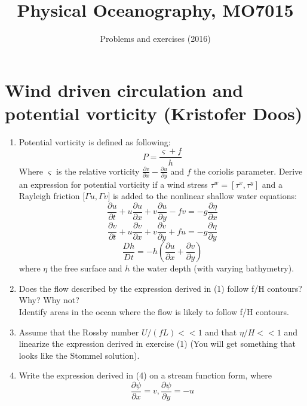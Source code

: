 \documentclass[a4paper,11pt]{article}
\title{Physical Oceanography, MO7015}
\author{Problems and exercises (2016)}
\begin{document}
\date{}
\maketitle

\section{Wind driven circulation and potential vorticity (Kristofer Doos)}
\begin{enumerate}
\item Potential vorticity is defined as following:
\begin{equation}
P=\frac{\varsigma+f}{h} 
\end{equation}
Where $\varsigma$ is the relative vorticity $\frac{\partial v}{\partial x} - \frac{\partial u}{\partial y}$ and $f$ the coriolis parameter. Derive an expression for potential vorticity if a wind stress $\tau^{w} = [\tau^{x},\tau^{y}]$ and a Rayleigh friction [$\Gamma u,\Gamma v]$ is added to the nonlinear shallow water equations:
\begin{equation}
\frac{\partial u}{\partial t} + u\frac{\partial u}{\partial x} + v\frac{\partial u}{\partial y}-fv = -g\frac{\partial \eta}{\partial x}
\end{equation}
\begin{equation}
\frac{\partial v}{\partial t} + u\frac{\partial v}{\partial x} + v\frac{\partial v}{\partial y}+fu = -g\frac{\partial \eta}{\partial y}
\end{equation}
\begin{equation}
\frac{Dh}{Dt} = -h\left(\frac{\partial u}{\partial x} + \frac{\partial v}{\partial y}\right)
\end{equation}
where $\eta$ the free surface and $h$ the water depth (with varying bathymetry).

\item Does the flow described by the expression derived in (1) follow f/H contours?
Why? Why not?\\
Identify areas in the ocean where the flow is likely to follow f/H contours.

\item Assume that the Rossby number $U/(fL) << 1$ and that $\eta/H << 1$ and linearize the expression derived in exercise (1) (You will get something that looks like the Stommel solution).

\item Write the expression derived in (4) on a stream function form, where
\begin{equation}
\frac{\partial \psi}{\partial x} = v, \frac{\partial \psi}{\partial y} = -u
\end{equation}
\end{enumerate}
\end{document}
